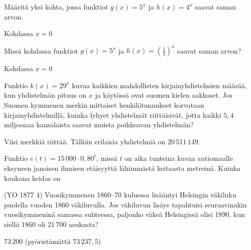 \begin{tehtavasivu}
\begin{tehtava} %
Määritä yksi kohta, jossa funktiot $g(x)=5^{x} $ ja $ h(x)=4^{x} $ saavat saman arvon.
\begin{vastaus}
Kohdassa $x=0$
\end{vastaus}
\end{tehtava}

\begin{tehtava}
Missä kohdassa funktiot $ g(x)=5^{x} $ ja $ h(x)=(\frac{1}{4})^{x} $ saavat saman arvon?
\begin{vastaus}
Kohdassa $x=0$
\end{vastaus}
\end{tehtava}


\begin{tehtava}
Funktio $ k(x)=29^{x}$ kuvaa kaikkien mahdollisten kirjainyhdistelmien määrää, kun yhdistelmän pituus on $x$ ja käytössä ovat suomen kielen aakkoset. Jos Suomen kymmenen merkin mittaiset henkilötunnukset korvataan kirjainyhdistelmillä, kuinka lyhyet yhdistelmät riittäisivät, jotta kaikki $ 5,4 $ miljoonaa kansalaista saavat muista poikkeavan yhdistelmän?
\begin{vastaus}
Viisi merkkiä riittää. Tällöin erilaisia yhdistelmiä on $20\,511\,149$.
\end{vastaus}
\end{tehtava}

\begin{tehtava}
Funktio $ e(t)=15\,000\cdot 0,80^{t}$, missä $t$ on aika tunteina kuvaa autiomaalle eksyneen janoisen ihmisen etäisyyttä lähimmästä keitaasta metreinä. Kuinka kaukana keidas on 
\begin{vastaus}
\end{vastaus}
\end{tehtava}

\begin{tehtava}
(YO 1877 4) Vuosikymmenen 1860--70 kuluessa lisääntyi Helsingin väkiluku puolella vuoden 1860 väkiluvulla. Jos väkiluvun lisäys tapahtuisi seuraavinakin vuosikymmeninä samassa suhteessa, paljonko väkeä Helsingissä olisi 1890, kun siellä 1860 oli $21\,700$ asukasta? 
	\begin{vastaus}
	$73\,200$ (pyöristämättä $73\,237,5$)
	\end{vastaus}
\end{tehtava}

\end{tehtavasivu}
